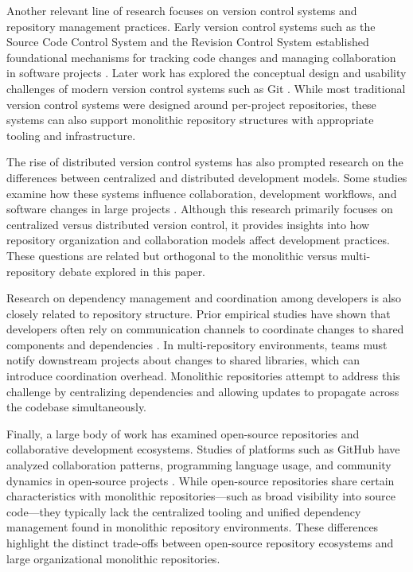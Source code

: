 Another relevant line of research focuses on version control systems and repository management practices. Early version control systems such as the Source Code Control System and the Revision Control System established foundational mechanisms for tracking code changes and managing collaboration in software projects \cite{rochkind1975sccs,tichy1985rcs}. Later work has explored the conceptual design and usability challenges of modern version control systems such as Git \cite{perez2013git,perez2016purposes}. While most traditional version control systems were designed around per-project repositories, these systems can also support monolithic repository structures with appropriate tooling and infrastructure.

The rise of distributed version control systems has also prompted research on the differences between centralized and distributed development models. Some studies examine how these systems influence collaboration, development workflows, and software changes in large projects \cite{brindescu2014impact,deAlwis2009why}. Although this research primarily focuses on centralized versus distributed version control, it provides insights into how repository organization and collaboration models affect development practices. These questions are related but orthogonal to the monolithic versus multi-repository debate explored in this paper.

Research on dependency management and coordination among developers is also closely related to repository structure. Prior empirical studies have shown that developers often rely on communication channels to coordinate changes to shared components and dependencies \cite{desouza2008empirical}. In multi-repository environments, teams must notify downstream projects about changes to shared libraries, which can introduce coordination overhead. Monolithic repositories attempt to address this challenge by centralizing dependencies and allowing updates to propagate across the codebase simultaneously.

Finally, a large body of work has examined open-source repositories and collaborative development ecosystems. Studies of platforms such as GitHub have analyzed collaboration patterns, programming language usage, and community dynamics in open-source projects \cite{kalliamvakou2014promises,vasilescu2016sky,ray2014languages}. While open-source repositories share certain characteristics with monolithic repositories—such as broad visibility into source code—they typically lack the centralized tooling and unified dependency management found in monolithic repository environments. These differences highlight the distinct trade-offs between open-source repository ecosystems and large organizational monolithic repositories.
